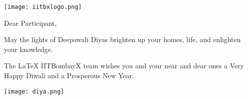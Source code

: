 \documentclass[12pt,dvipsnames]{beamer}
\begin{document}
\begin{frame}[t]
    \rmfamily %
	\color{Maroon!60!black}	%
	
	\flushright
	\texttt{[image: iitbxlogo.png]}\\

	\justify \large	

	Dear Participant,
	\medskip
	
	May the lights of Deepawali Diyas brighten up your homes, life, and enlighten your knowledge.
	\medskip
	 
	The LaTeX IITBombayX team wishes you and your near and dear ones a Very Happy Diwali and a Prosperous New Year. 

	\vfill
	\centering    
	\texttt{[image: diya.png]}
\end{frame}
\end{document}
